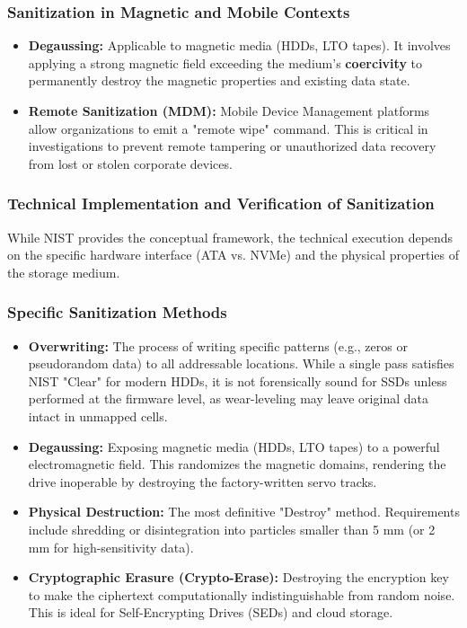 \subsubsection*{Sanitization in Magnetic and Mobile Contexts}
\begin{itemize}
    \item \textbf{Degaussing:} Applicable to magnetic media (HDDs, LTO tapes). It involves applying a strong magnetic field exceeding the medium's \textbf{coercivity} to permanently destroy the magnetic properties and existing data state.
    \item \textbf{Remote Sanitization (MDM):} Mobile Device Management platforms allow organizations to emit a "remote wipe" command. This is critical in investigations to prevent remote tampering or unauthorized data recovery from lost or stolen corporate devices.
\end{itemize}

\subsubsection*{Technical Implementation and Verification of Sanitization}

While NIST provides the conceptual framework, the technical execution depends on the specific hardware interface (ATA vs. NVMe) and the physical properties of the storage medium.

\subsubsection*{Specific Sanitization Methods}
\begin{itemize}
    \item \textbf{Overwriting:} The process of writing specific patterns (e.g., zeros or pseudorandom data) to all addressable locations. While a single pass satisfies NIST "Clear" for modern HDDs, it is not forensically sound for SSDs unless performed at the firmware level, as wear-leveling may leave original data intact in unmapped cells.
    \item \textbf{Degaussing:} Exposing magnetic media (HDDs, LTO tapes) to a powerful electromagnetic field. This randomizes the magnetic domains, rendering the drive inoperable by destroying the factory-written servo tracks.
    \item \textbf{Physical Destruction:} The most definitive "Destroy" method. Requirements include shredding or disintegration into particles smaller than 5 mm (or 2 mm for high-sensitivity data).
    \item \textbf{Cryptographic Erasure (Crypto-Erase):} Destroying the encryption key to make the ciphertext computationally indistinguishable from random noise. This is ideal for Self-Encrypting Drives (SEDs) and cloud storage.
\end{itemize}

